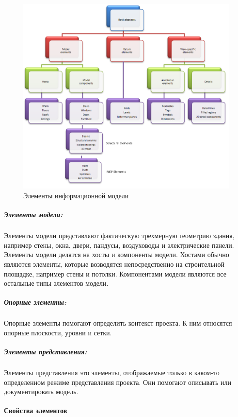 \begin{figure}[h]
    \includegraphics[width=\textwidth]{images/Revit-elements.png}
    \caption{Элементы информационной модели}
    \label{figure:RevitElements}
\end{figure}

\subparagraph{Элементы модели:}

Элементы модели представляют фактическую трехмерную геометрию здания,
например стены, окна, двери, пандусы,
воздуховоды и электрические панели.
Элементы модели делятся на хосты и компоненты модели.
Хостами обычно являются элементы,
которые возводятся непосредственно на строительной площадке,
например стены и потолки.
Компонентами модели являются все остальные типы элементов модели.

\subparagraph{Опорные элементы:}

Опорные элементы помогают определить контекст проекта.
К ним относятся опорные плоскости, уровни и сетки.

\subparagraph{Элементы представления:}

Элементы представления это элементы,
отображаемые только в каком-то определенном режиме представления проекта.
Они помогают описывать или документировать модель.

\paragraph{Свойства элементов}

